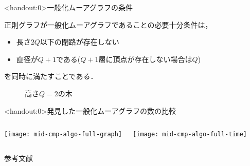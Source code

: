 \appendix
\begin{frame}<handout:0>{一般化ムーアグラフの条件}
  \begin{thm}
    正則グラフが一般化ムーアグラフであることの必要十分条件は，
    \begin{itemize}
    \item 長さ$2Q$以下の閉路が存在しない
    \item 直径が$Q+1$である($Q+1$層に頂点が存在しない場合は$Q$)
    \end{itemize}
    を同時に満たすことである．
  \end{thm}
  \begin{figure}
    \centering
    \def\svgwith{.4\textwidth}
    \resizebox{.4\textwidth}{!}{
      
    }
    \caption{高さ$Q=2$の木}
  \end{figure}
\end{frame}

\begin{frame}<handout:0>{発見した一般化ムーアグラフの数の比較}
  \begin{columns}
    \begin{minipage}[t]{.5\textwidth}
      \centering
      \texttt{[image: mid-cmp-algo-full-graph]}
      \label{fig:full-graph}
    \end{minipage}
    \hspace{1ex}
    \begin{minipage}[t]{.5\textwidth}
      \centering
      \texttt{[image: mid-cmp-algo-full-time]}
      \label{fig:full-time}
    \end{minipage}
  \end{columns}
\end{frame}

\begin{frame}[allowframebreaks]{参考文献}
  
\end{frame}

